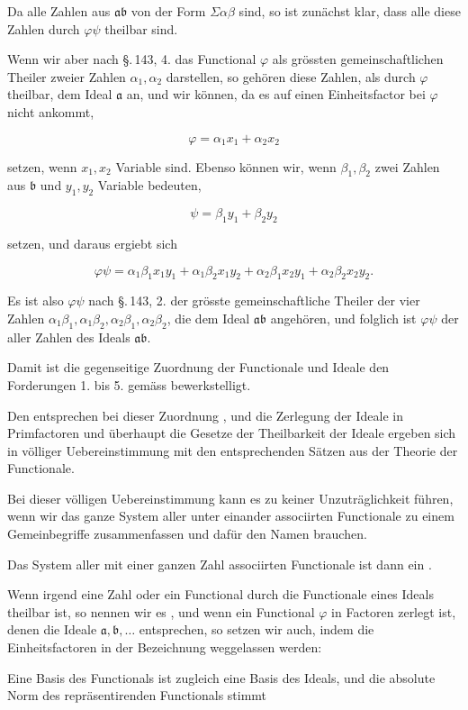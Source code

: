 Da alle Zahlen aus $\mathfrak{a}\mathfrak{b}$ von der Form $\Sigma\alpha\beta$ sind, so ist zunächst
 klar, dass alle diese Zahlen durch $\varphi\psi$ theilbar sind.

Wenn wir aber nach \S.\,143, 4. das Functional $\varphi$ als grössten
gemeinschaftlichen Theiler zweier Zahlen $\alpha_1, \alpha_2$ darstellen, so
gehören diese Zahlen, als durch $\varphi$ theilbar, dem Ideal $\mathfrak{a}$ an,
und wir können, da es auf einen Einheitsfactor bei $\varphi$ nicht
ankommt,

\[
\varphi = \alpha_1 x_1 + \alpha_2 x_2
\]

setzen, wenn $x_1, x_2$ Variable sind. Ebenso können wir, wenn
$\beta_1, \beta_2$ zwei Zahlen aus $\mathfrak{b}$ und $y_1, y_2$ Variable bedeuten,

\[
\psi = \beta_1 y_1 + \beta_2 y_2
\]

setzen, und daraus ergiebt sich

\[
\varphi\psi = \alpha_1 \beta_1 x_1 y_1 + \alpha_1 \beta_2 x_1 y_2 + \alpha_2 \beta_1 x_2 y_1 + \alpha_2 \beta_2 x_2 y_2.
\]

Es ist also $\varphi\psi$ nach \S.\,143, 2. der grösste gemeinschaftliche
Theiler der vier Zahlen $\alpha_1\beta_1, \alpha_1\beta_2, \alpha_2\beta_1, \alpha_2\beta_2$, die dem Ideal
$\mathfrak{a}\mathfrak{b}$ angehören, und folglich ist $\varphi\psi$ der  aller Zahlen des Ideals $\mathfrak{a}\mathfrak{b}$.

Damit ist die gegenseitige Zuordnung der Functionale und
Ideale den Forderungen 1. bis 5. gemäss bewerkstelligt.

Den  entsprechen bei dieser Zuordnung
, und die Zerlegung der Ideale in Primfactoren und
überhaupt die Gesetze der Theilbarkeit der Ideale ergeben sich
in völliger Uebereinstimmung mit den entsprechenden Sätzen
aus der Theorie der Functionale.

Bei dieser völligen Uebereinstimmung kann es zu keiner
Unzuträglichkeit führen, wenn wir das ganze System aller unter
einander associirten Functionale zu einem Gemeinbegriffe zusammenfassen
 und dafür den Namen  brauchen.

Das System aller mit einer ganzen Zahl associirten Functionale
 ist dann ein .

Wenn irgend eine Zahl oder ein Functional durch die
Functionale eines Ideals theilbar ist, so nennen wir es , und wenn ein Functional $\varphi$ in Factoren
zerlegt ist, denen die Ideale $\mathfrak{a}, \mathfrak{b}, \ldots$ entsprechen, so setzen wir
auch, indem die Einheitsfactoren in der Bezeichnung weggelassen
 werden:


Eine Basis des Functionals ist zugleich eine Basis des Ideals,
und die absolute Norm des repräsentirenden Functionals stimmt
